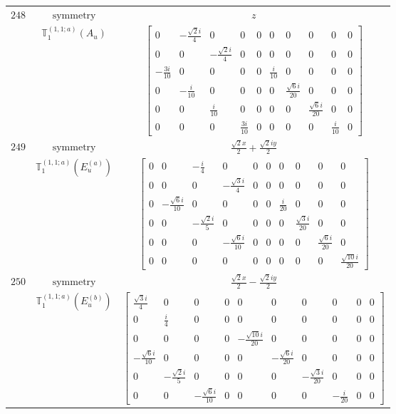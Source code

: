 \documentclass[fleqn,8pt,landscape]{jsarticle}
\begin{document}
\begin{longtable}{ccc}
$ 248 $ & $ \text{symmetry} $ & $ z $ \\
$  $ & $ \mathbb{T}_{1}^{(1,1;a)}(A_{u}) $ & $ \begin{bmatrix} 0 & - \frac{\sqrt{2} i}{4} & 0 & 0 & 0 & 0 & 0 & 0 & 0 & 0 \\ 0 & 0 & - \frac{\sqrt{2} i}{4} & 0 & 0 & 0 & 0 & 0 & 0 & 0 \\ - \frac{3 i}{10} & 0 & 0 & 0 & 0 & \frac{i}{10} & 0 & 0 & 0 & 0 \\ 0 & - \frac{i}{10} & 0 & 0 & 0 & 0 & \frac{\sqrt{6} i}{20} & 0 & 0 & 0 \\ 0 & 0 & \frac{i}{10} & 0 & 0 & 0 & 0 & \frac{\sqrt{6} i}{20} & 0 & 0 \\ 0 & 0 & 0 & \frac{3 i}{10} & 0 & 0 & 0 & 0 & \frac{i}{10} & 0 \end{bmatrix} $ \\ \hline
$ 249 $ & $ \text{symmetry} $ & $ \frac{\sqrt{2} x}{2} + \frac{\sqrt{2} i y}{2} $ \\
$  $ & $ \mathbb{T}_{1}^{(1,1;a)}(E_{u}^{(a)}) $ & $ \begin{bmatrix} 0 & 0 & - \frac{i}{4} & 0 & 0 & 0 & 0 & 0 & 0 & 0 \\ 0 & 0 & 0 & - \frac{\sqrt{3} i}{4} & 0 & 0 & 0 & 0 & 0 & 0 \\ 0 & - \frac{\sqrt{6} i}{10} & 0 & 0 & 0 & 0 & \frac{i}{20} & 0 & 0 & 0 \\ 0 & 0 & - \frac{\sqrt{2} i}{5} & 0 & 0 & 0 & 0 & \frac{\sqrt{3} i}{20} & 0 & 0 \\ 0 & 0 & 0 & - \frac{\sqrt{6} i}{10} & 0 & 0 & 0 & 0 & \frac{\sqrt{6} i}{20} & 0 \\ 0 & 0 & 0 & 0 & 0 & 0 & 0 & 0 & 0 & \frac{\sqrt{10} i}{20} \end{bmatrix} $ \\ \hline
$ 250 $ & $ \text{symmetry} $ & $ \frac{\sqrt{2} x}{2} - \frac{\sqrt{2} i y}{2} $ \\
$  $ & $ \mathbb{T}_{1}^{(1,1;a)}(E_{u}^{(b)}) $ & $ \begin{bmatrix} \frac{\sqrt{3} i}{4} & 0 & 0 & 0 & 0 & 0 & 0 & 0 & 0 & 0 \\ 0 & \frac{i}{4} & 0 & 0 & 0 & 0 & 0 & 0 & 0 & 0 \\ 0 & 0 & 0 & 0 & - \frac{\sqrt{10} i}{20} & 0 & 0 & 0 & 0 & 0 \\ - \frac{\sqrt{6} i}{10} & 0 & 0 & 0 & 0 & - \frac{\sqrt{6} i}{20} & 0 & 0 & 0 & 0 \\ 0 & - \frac{\sqrt{2} i}{5} & 0 & 0 & 0 & 0 & - \frac{\sqrt{3} i}{20} & 0 & 0 & 0 \\ 0 & 0 & - \frac{\sqrt{6} i}{10} & 0 & 0 & 0 & 0 & - \frac{i}{20} & 0 & 0 \end{bmatrix} $ \\ \hline

\end{longtable}
\end{document}
